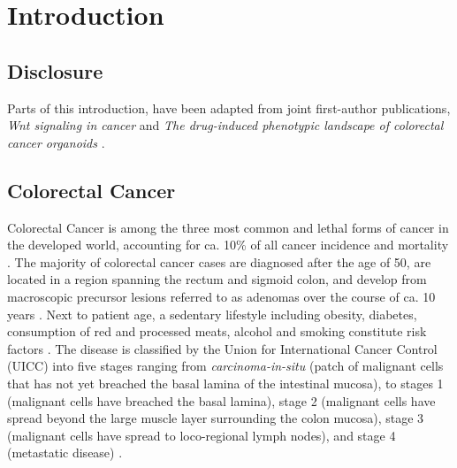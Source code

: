 \chapter{Introduction}
\label{introduction}
\begin{flushleft}
\setlength{\parindent}{7ex}
\section{Disclosure}
Parts of this introduction, have been adapted from joint first-author publications, \textit{Wnt signaling in cancer} \parencite{zhanWntSignalingCancer2017} and \textit{The drug-induced phenotypic landscape of colorectal cancer organoids} \parencite{betgeDruginducedPhenotypicLandscape2022}.

\section{Colorectal Cancer}
Colorectal Cancer is among the three most common and lethal forms of cancer in the developed world, accounting for ca. 10\% of all cancer incidence and mortality \parencite{sungGlobalCancerStatistics2021}. The majority of colorectal cancer cases are diagnosed after the age of 50, are located in a region spanning the rectum and sigmoid colon, and develop from macroscopic precursor lesions referred to as adenomas over the course of ca. 10 years \parencite{choGeneticAlterationsAdenoma1992}. Next to patient age, a sedentary lifestyle including obesity, diabetes, consumption of red and processed meats, alcohol and smoking constitute risk factors \parencite{sungGlobalCancerStatistics2021}. The disease is classified by the Union for International Cancer Control (UICC) into five stages ranging from \textit{carcinoma-in-situ} (patch of malignant cells that has not yet breached the basal lamina of the intestinal mucosa), to stages 1 (malignant cells have breached the basal lamina), stage 2 (malignant cells have spread beyond the large muscle layer surrounding the colon mucosa), stage 3 (malignant cells have spread to loco-regional lymph nodes), and stage 4 (metastatic disease) \parencite{vancutsemESMOConsensusGuidelines2016a}.
\par


\end{flushleft}
